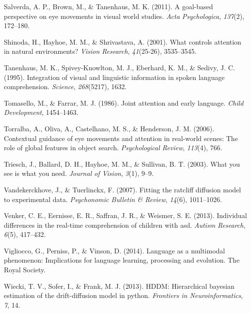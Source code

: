 \documentclass[,man,floatsintext]{apa6}
\begin{document}
\leavevmode\hypertarget{ref-salverda2011goal}{}%
Salverda, A. P., Brown, M., \& Tanenhaus, M. K. (2011). A goal-based perspective on eye movements in visual world studies. \emph{Acta Psychologica}, \emph{137}(2), 172--180.

\leavevmode\hypertarget{ref-shinoda2001controls}{}%
Shinoda, H., Hayhoe, M. M., \& Shrivastava, A. (2001). What controls attention in natural environments? \emph{Vision Research}, \emph{41}(25-26), 3535--3545.

\leavevmode\hypertarget{ref-tanenhaus1995integration}{}%
Tanenhaus, M. K., Spivey-Knowlton, M. J., Eberhard, K. M., \& Sedivy, J. C. (1995). Integration of visual and linguistic information in spoken language comprehension. \emph{Science}, \emph{268}(5217), 1632.

\leavevmode\hypertarget{ref-tomasello1986joint}{}%
Tomasello, M., \& Farrar, M. J. (1986). Joint attention and early language. \emph{Child Development}, 1454--1463.

\leavevmode\hypertarget{ref-torralba2006contextual}{}%
Torralba, A., Oliva, A., Castelhano, M. S., \& Henderson, J. M. (2006). Contextual guidance of eye movements and attention in real-world scenes: The role of global features in object search. \emph{Psychological Review}, \emph{113}(4), 766.

\leavevmode\hypertarget{ref-triesch2003you}{}%
Triesch, J., Ballard, D. H., Hayhoe, M. M., \& Sullivan, B. T. (2003). What you see is what you need. \emph{Journal of Vision}, \emph{3}(1), 9--9.

\leavevmode\hypertarget{ref-vandekerckhove2007fitting}{}%
Vandekerckhove, J., \& Tuerlinckx, F. (2007). Fitting the ratcliff diffusion model to experimental data. \emph{Psychonomic Bulletin \& Review}, \emph{14}(6), 1011--1026.

\leavevmode\hypertarget{ref-venker2013individual}{}%
Venker, C. E., Eernisse, E. R., Saffran, J. R., \& Weismer, S. E. (2013). Individual differences in the real-time comprehension of children with asd. \emph{Autism Research}, \emph{6}(5), 417--432.

\leavevmode\hypertarget{ref-vigliocco2014language}{}%
Vigliocco, G., Perniss, P., \& Vinson, D. (2014). Language as a multimodal phenomenon: Implications for language learning, processing and evolution. The Royal Society.

\leavevmode\hypertarget{ref-wiecki2013hddm}{}%
Wiecki, T. V., Sofer, I., \& Frank, M. J. (2013). HDDM: Hierarchical bayesian estimation of the drift-diffusion model in python. \emph{Frontiers in Neuroinformatics}, \emph{7}, 14.
\end{document}
